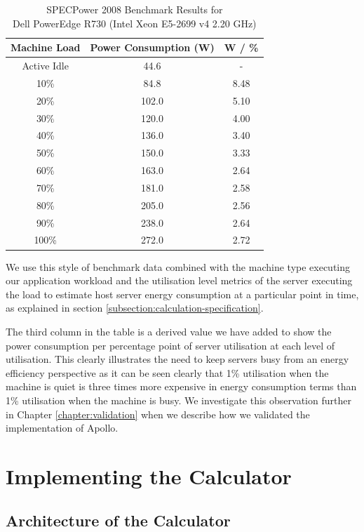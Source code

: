 \begin{table}
\centering
\caption{SPECPower 2008 Benchmark Results for \\Dell PowerEdge R730 (Intel Xeon E5-2699 v4 2.20 GHz)}
\label{table:powervalues}
\footnotesize
\begin{tabular}{|c|c|c|}
\hline
Machine Load & Power Consumption (W) & W / \% \\
\hline
\hline
Active Idle  &  44.6 & -    \\
10\%         &  84.8 & 8.48 \\
20\%         & 102.0 & 5.10 \\
30\%         & 120.0 & 4.00 \\
40\%         & 136.0 & 3.40 \\
50\%         & 150.0 & 3.33 \\
60\%         & 163.0 & 2.64 \\
70\%         & 181.0 & 2.58 \\
80\%         & 205.0 & 2.56 \\
90\%         & 238.0 & 2.64 \\
100\%        & 272.0 & 2.72 \\
\hline
\end{tabular}
\end{table}

We use this style of benchmark data combined with the machine type executing our application workload and the utilisation level metrics of the server executing the load to estimate host server energy consumption at a particular point in time, as explained in section \ref{subsection:calculation-specification}.

The third column in the table is a derived value we have added to show the power consumption per percentage point of server utilisation at each level of utilisation.  This clearly illustrates the need to keep servers busy from an energy efficiency perspective as it can be seen clearly that 1\% utilisation when the machine is quiet is three times more expensive in energy consumption terms than 1\% utilisation when the machine is busy.  We investigate this observation further in Chapter \ref{chapter:validation} when we describe how we validated the implementation of Apollo.

\section{Implementing the Calculator}

\subsection{Architecture of the Calculator}


